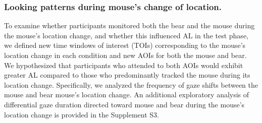\documentclass[
  man,floatsintext]{apa6}
\begin{document}
\subsubsection{Looking patterns during mouse's change of location.}\label{looking-patterns-during-mouses-change-of-location.}

To examine whether participants monitored both the bear and the mouse during the mouse's location change, and whether this influenced AL in the test phase, we defined new time windows of interest (TOIs) corresponding to the mouse's location change in each condition and new AOIs for both the mouse and bear. We hypothesized that participants who attended to both AOIs would exhibit greater AL compared to those who predominantly tracked the mouse during its location change. Specifically, we analyzed the frequency of gaze shifts between the mouse and bear mouse's location change. An additional exploratory analysis of differential gaze duration directed toward mouse and bear during the mouse's location change is provided in the Supplement S3.
\end{document}
